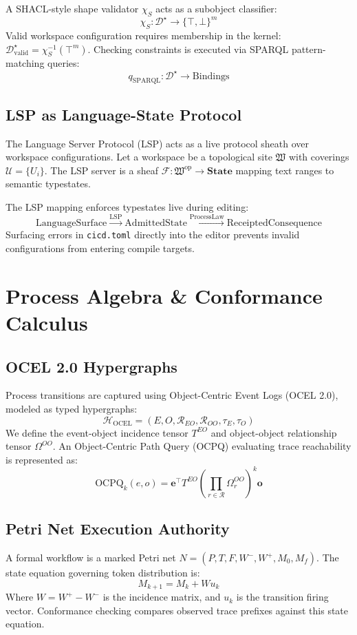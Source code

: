 \documentclass[11pt,a4paper,oneside]{book}
\begin{document}
A SHACL-style shape validator $\chi_S$ acts as a subobject classifier:
\[
\chi_S: \mathcal{D}^{\star} \to \{\top, \bot\}^m
\]
Valid workspace configuration requires membership in the kernel: $\mathcal{D}^{\star}_{\mathrm{valid}} = \chi_S^{-1}(\top^m)$. Checking constraints is executed via SPARQL pattern-matching queries:
\[
q_{\mathrm{SPARQL}}: \mathcal{D}^{\star} \to \mathrm{Bindings}
\]

\section{LSP as Language-State Protocol}
The Language Server Protocol (LSP) acts as a live protocol sheath over workspace configurations. Let a workspace be a topological site $\mathfrak{W}$ with coverings $\mathcal{U} = \{U_i\}$. The LSP server is a sheaf $\mathcal{F}: \mathfrak{W}^{\mathrm{op}} \to \mathbf{State}$ mapping text ranges to semantic typestates.

The LSP mapping enforces typestates live during editing:
\[
\text{LanguageSurface} \xrightarrow{\mathrm{LSP}} \text{AdmittedState} \xrightarrow{\text{ProcessLaw}} \text{ReceiptedConsequence}
\]
Surfacing errors in \texttt{cicd.toml} directly into the editor prevents invalid configurations from entering compile targets.

\chapter{Process Algebra \& Conformance Calculus}

\section{OCEL 2.0 Hypergraphs}
Process transitions are captured using Object-Centric Event Logs (OCEL 2.0), modeled as typed hypergraphs:
\[
\mathcal{H}_{\mathrm{OCEL}} = (E, O, \mathcal{R}_{EO}, \mathcal{R}_{OO}, \tau_E, \tau_O)
\]
We define the event-object incidence tensor $T^{EO}$ and object-object relationship tensor $\Omega^{OO}$. An Object-Centric Path Query (OCPQ) evaluating trace reachability is represented as:
\[
\mathrm{OCPQ}_k(e, o) = \mathbf{e}^{\top} T^{EO} \left( \prod_{r \in \mathcal{R}} \Omega^{OO}_r \right)^k \mathbf{o}
\]

\section{Petri Net Execution Authority}
A formal workflow is a marked Petri net $N = (P, T, F, W^-, W^+, M_0, M_f)$. The state equation governing token distribution is:
\[
M_{k+1} = M_k + W u_k
\]
Where $W = W^+ - W^-$ is the incidence matrix, and $u_k$ is the transition firing vector. Conformance checking compares observed trace prefixes against this state equation.
\end{document}
